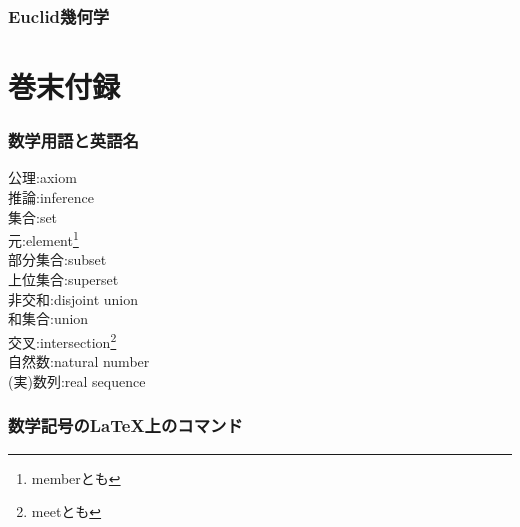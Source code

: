 \documentclass[hyperref,a4paper,12pt]{kininaruki}
\begin{document}
\section{Euclid幾何学}
\part{巻末付録}
\section{数学用語と英語名}
\begin{multicols*}{3}
\noindent
\hypertarget{axiom}{公理}:axiom\\
\hypertarget{inference}{推論}:inference\\
\hypertarget{set}{集合}:set\\
\hypertarget{member}{元}:element\footnote{memberとも}\\
\hypertarget{subset}{部分集合}:subset\\
\hypertarget{superset}{上位集合}:superset\\
\hypertarget{dunion}{非交和}:disjoint union\\
\hypertarget{union}{和集合}:union\\
\hypertarget{intersection}{交叉}:intersection\footnote{meetとも}\\
\hypertarget{natural}{自然数}:natural number\\
\hypertarget{real_seq}{(実)数列}:real sequence\\
\end{multicols*}
\newpage
\section{数学記号のLaTeX上のコマンド}
\newpage
{} {}
\printindex
\end{document}
